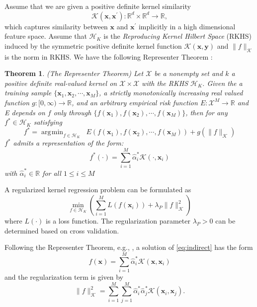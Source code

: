 \documentclass[letterpaper,12pt,titlepage,oneside,final]{book}
\numberwithin{equation}{section}
\newtheorem{thm}{Theorem}[section]
\theoremstyle{definition}
\newcommand{\vx}{\mathbf{x}}
\newcommand{\HK}{\mathcal{H}_K}
\newcommand{\XS}{\mathcal{X}}
\newcommand{\Real}{\mathbb{R}}
\DeclareMathOperator*{\argmin}{\arg\!\min}
\begin{document}
Assume that we are given a positive definite kernel similarity
 $$
 \mathcal{K}(\vx, \vx^\prime) : \Real^{d} \times \Real^{d} \rightarrow  \Real,
 $$
 which captures  similarity between $\vx$ and $\vx^\prime$ implicitly in a high dimensional feature space.
 Assume that $\HK$ is the  \emph{Reproducing Kernel Hilbert Space} (RKHS) induced by the symmetric positive definite kernel function $ \mathcal{K}(\mathbf{x},\mathbf{y})$ and $\|f\|_{ \mathcal{K}}$ is the norm in RKHS.
 We have the following Representer Theorem \citep{wahba1990spline}:
\begin{thm}\label{pc:representer}
 (The Representer Theorem)
Let $\XS$ be a nonempty set and $k$ a positive definite real-valued kernel on $\XS \times \XS$ with the RKHS $\HK$.  Given the a training sample $
 \{\mathbf{x}_1, \mathbf{x}_2, \cdots, \mathbf{x}_M\} $, a strictly monotonically increasing real valued function $g:[0, \infty) \rightarrow \Real $,  and an arbitrary empirical risk function $E:\XS^M \rightarrow \Real $ and E depends on $f$ only through  $\{f(\mathbf{x}_1), f(\mathbf{x}_2), \cdots, f(\mathbf{x}_M)\}$, then for any $f^* \in \HK$ satisfying
 \[
 f^*=\argmin_{f \in \HK} \;\;E\left(f(\mathbf{x}_1), f(\mathbf{x}_2), \cdots, f(\mathbf{x}_M)\right) + g( \|f\|_{\mathcal{K}})
 \]
 $f^*$ admits a representation of the form:
 \[
 f^*(\cdot)=\sum_{i=1}^M \widehat{\alpha}^*_i \mathcal{K}(\cdot,\mathbf{x}_i)
 \]
 with $\widehat{\alpha}^*_i \in \Real$  for all $1 \leq i \leq M$
\end{thm}

A regularized kernel regression problem can be formulated as
\begin{equation}
\min_{f \in \HK}\left(  \sum_{i=1}^M L(f(\vx_i))+\lambda_P \|f\|^2_{\mathcal{K}}\right)
\label{eq:indirect}
\end{equation}
where $L(\cdot)$ is a loss function.
The regularization parameter $\lambda_P>0$  can be determined based on cross validation.

Following the Representer Theorem,  e.g., \citep{wahba1990spline}, a solution of  \eqref{eq:indirect} has the form
\begin{equation}\label{kr1}
f(\mathbf{x})=\sum_{i=1}^M \widehat{\alpha}^*_i \mathcal{K}(\mathbf{x},\mathbf{x}_i)
\end{equation}
and the regularization term is given by
\begin{equation}\label{kr2}
\|f\|_{\mathcal{K}}^2=\sum_{i=1}^M \sum_{j=1}^M  \widehat{\alpha}^*_i \widehat{\alpha}^*_j \mathcal{K}(\mathbf{x}_i,\mathbf{x}_j).
\end{equation}
\end{document}
